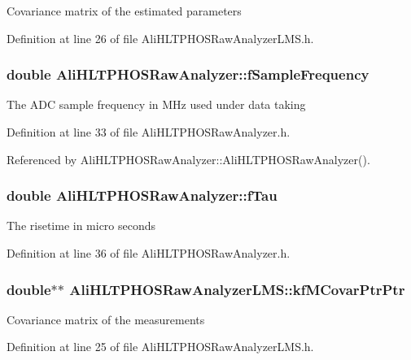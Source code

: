 Covariance matrix of the estimated parameters 

Definition at line 26 of file Ali\-HLTPHOSRaw\-Analyzer\-LMS.h.
\subsubsection{\setlength{\rightskip}{0pt plus 5cm}double {\bf Ali\-HLTPHOSRaw\-Analyzer::f\-Sample\-Frequency}\hspace{0.3cm}{\tt  [protected, inherited]}}\label{classAliHLTPHOSRawAnalyzer_AliHLTPHOSRawAnalyzerPeakFinderp1}


The ADC sample frequency in MHz used under data taking 

Definition at line 33 of file Ali\-HLTPHOSRaw\-Analyzer.h.

Referenced by Ali\-HLTPHOSRaw\-Analyzer::Ali\-HLTPHOSRaw\-Analyzer().
\subsubsection{\setlength{\rightskip}{0pt plus 5cm}double {\bf Ali\-HLTPHOSRaw\-Analyzer::f\-Tau}\hspace{0.3cm}{\tt  [protected, inherited]}}\label{classAliHLTPHOSRawAnalyzer_AliHLTPHOSRawAnalyzerPeakFinderp4}


The risetime in micro seconds 

Definition at line 36 of file Ali\-HLTPHOSRaw\-Analyzer.h.
\subsubsection{\setlength{\rightskip}{0pt plus 5cm}double$\ast$$\ast$ {\bf Ali\-HLTPHOSRaw\-Analyzer\-LMS::kf\-MCovar\-Ptr\-Ptr}\hspace{0.3cm}{\tt  [private]}}\label{classAliHLTPHOSRawAnalyzerLMS_AliHLTPHOSRawAnalyzerLMSr0}


Covariance matrix of the measurements 

Definition at line 25 of file Ali\-HLTPHOSRaw\-Analyzer\-LMS.h.
